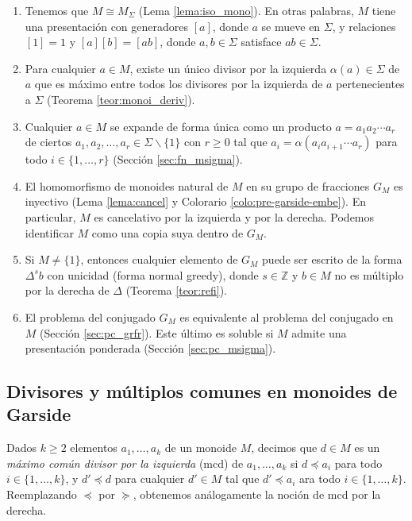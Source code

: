 \documentclass[12pt]{book}
\theoremstyle{definition}
\begin{document}
\begin{enumerate}[label=(\arabic*)]
\item Tenemos que $M\cong M_\Sigma$ (Lema \ref{lema:iso_mono}). En otras palabras, $M$ tiene una presentación con generadores $[a]$, donde $a$ se mueve en $\Sigma$, y relaciones $[1]=1$ y $[a][b]=[ab]$, donde $a,b\in\Sigma$ satisface $ab\in\Sigma$.
\item Para cualquier $a\in M$, existe un único divisor por la izquierda $\alpha(a)\in\Sigma$ de $a$ que es máximo entre todos los divisores por la izquierda de $a$ pertenecientes a $\Sigma$ (Teorema \ref{teor:monoi_deriv}).
\item Cualquier $a\in M$ se expande de forma única como un producto $a=a_1a_2\cdots a_r$ de ciertos $a_1,a_2,\ldots,a_r\in\Sigma \backslash\{1\}$ con $r\geq 0$ tal que $a_i=\alpha(a_ia_{i+1}\cdots a_r)$ para todo $i\in\{1,\ldots,r\}$ (Sección \ref{sec:fn_msigma}).
\item El homomorfismo de monoides natural de $M$ en su grupo de fracciones $G_M$ es inyectivo (Lema \ref{lema:cancel} y Colorario \ref{colo:pre-garside-embe}). En particular, $M$ es cancelativo por la izquierda y por la derecha. Podemos identificar $M$ como una copia suya dentro de $G_M$.
\item Si $M\neq \{1\}$, entonces cualquier elemento de $G_M$ puede ser escrito de la forma $\Delta^s b$ con unicidad (forma normal greedy), donde $s\in\mathbb{Z}$ y $b\in M$ no es múltiplo por la derecha de $\Delta$ (Teorema \ref{teor:refi}).
\item El problema del conjugado $G_M$ es equivalente al problema del conjugado en $M$ (Sección \ref{sec:pc_grfr}). Este último es soluble si $M$ admite una presentación ponderada (Sección \ref{sec:pc_msigma}).
\end{enumerate}

\subsection{Divisores y múltiplos comunes en monoides de Garside}

Dados $k\geq 2$ elementos $a_1,\ldots,a_k$ de un monoide $M$, decimos que $d\in M$ es un \textit{máximo común divisor por la izquierda} (mcd) de $a_1,\ldots,a_k$ si $d\preceq a_i$ para todo $i\in\{1,\ldots,k\}$, y $d'\preceq d$ para cualquier $d'\in M$ tal que $d'\preceq a_i$ ara todo $i\in\{1,\ldots,k\}$. Reemplazando $\preceq$ por $\succeq$, obtenemos análogamente la noción de mcd por la derecha.
\end{document}
